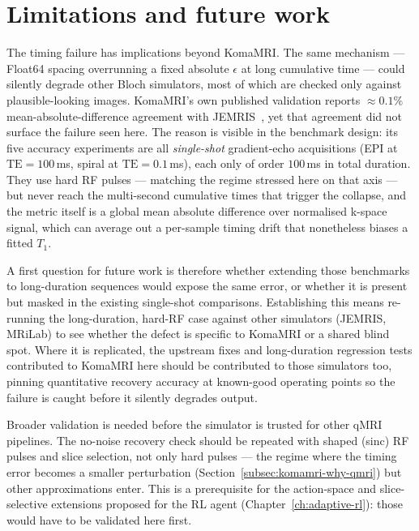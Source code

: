 \section{Limitations and future work}
\label{sec:komamri-limitations}

The timing failure has implications beyond KomaMRI. The same mechanism ---
Float64 spacing overrunning a fixed absolute $\epsilon$ at long cumulative time
--- could silently degrade other Bloch simulators, most of which are checked
only against plausible-looking images. KomaMRI's own published validation
reports ${\approx}0.1\%$ mean-absolute-difference agreement with
JEMRIS~\cite{komaMRI:23,stoecker_jemris_2010}, yet that agreement did not
surface the failure seen here. The reason is visible in the benchmark design:
its five accuracy experiments are all \emph{single-shot} gradient-echo
acquisitions (EPI at $\mathrm{TE}=100$\,ms, spiral at $\mathrm{TE}=0.1$\,ms),
each only of order $100$\,ms in total duration. They use hard RF pulses ---
matching the regime stressed here on that axis --- but never reach the
multi-second cumulative times that trigger the collapse, and the metric itself
is a global mean absolute difference over normalised k-space signal, which can
average out a per-sample timing drift that nonetheless biases a fitted $T_1$.

A first question for future work is therefore whether extending those
benchmarks to long-duration sequences would expose the same error, or whether
it is present but masked in the existing single-shot comparisons. Establishing
this means re-running the long-duration, hard-RF case against other simulators
(JEMRIS, MRiLab) to see whether the defect is specific to KomaMRI or a shared
blind spot. Where it is replicated, the upstream fixes and long-duration
regression tests contributed to KomaMRI here should be contributed to those
simulators too, pinning quantitative recovery accuracy at known-good operating
points so the failure is caught before it silently degrades output.

Broader validation is needed before the simulator is trusted for other qMRI
pipelines. The no-noise recovery check should be repeated with shaped (sinc) RF
pulses and slice selection, not only hard pulses --- the regime where the timing
error becomes a smaller perturbation (Section~\ref{subsec:komamri-why-qmri}) but
other approximations enter. This is a prerequisite for the action-space and
slice-selective extensions proposed for the RL agent
(Chapter~\ref{ch:adaptive-rl}): those would have to be validated here first.

